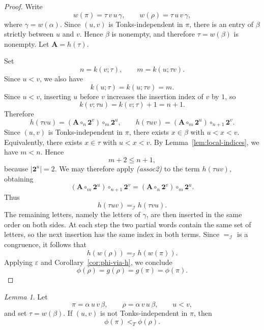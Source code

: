 \documentclass[a4paper]{article}
\theoremstyle{plain}
\theoremstyle{definition}
\theoremstyle{remark}
\numberwithin{equation}{section}
\renewcommand{\le}{\leqslant}\renewcommand{\ge}{\geqslant}
\newcommand{\eval}{\varepsilon}
\newtheorem{lemma}[theorem]{Lemma}
\begin{document}
\begin{proof}
Write
\[
w(\pi)=\tau\,v\,u\,\gamma,
\qquad
w(\rho)=\tau\,u\,v\,\gamma,
\]
where \(\gamma=w(\alpha)\). Since \((u,v)\) is Tonks-independent in \(\pi\),
there is an entry of \(\beta\) strictly between \(u\) and \(v\). Hence
\(\beta\) is nonempty, and therefore \(\tau=w(\beta)\) is nonempty. Let
\(\mathbf A=h(\tau)\).

Set
\[
n=k(v;\tau),
\qquad
m=k(u;\tau v).
\]
Since \(u<v\), we also have
\[
k(u;\tau)=k(u;\tau v)=m.
\]
Since \(u<v\), inserting \(u\) before \(v\) increases the insertion index of \(v\)
by \(1\), so
\[
k(v;\tau u)=k(v;\tau)+1=n+1.
\]
Therefore
\[
h(\tau v u)=(\mathbf A\circ_n \mathbf 2^v)\circ_m \mathbf 2^u,
\qquad
h(\tau u v)=(\mathbf A\circ_m \mathbf 2^u)\circ_{n+1}\mathbf 2^v.
\]
Since \((u,v)\) is Tonks-independent in \(\pi\), there exists \(x\in\beta\) with
\(u<x<v\). Equivalently, there exists \(x\in\tau\) with \(u<x<v\). By
Lemma~\ref{lem:local-indices}, we have \(m<n\). Hence
\[
m+2\le n+1,
\]
because \(|\mathbf 2^u|=2\). We may therefore apply \emph{(assoc2)} to the term
\(h(\tau u v)\), obtaining
\[
(\mathbf A\circ_m \mathbf 2^u)\circ_{n+1}\mathbf 2^v
=
(\mathbf A\circ_n \mathbf 2^v)\circ_m \mathbf 2^u.
\]
Thus
\[
h(\tau u v)=_{\mathcal I} h(\tau v u).
\]
The remaining letters, namely the letters of \(\gamma\), are then inserted in
the same order on both sides. At each step the two partial words contain the
same set of letters, so the next insertion has the same index in both terms.
Since \(=_{\mathcal I}\) is a congruence, it follows that
\[
h(w(\rho))=_{\mathcal I} h(w(\pi)).
\]
Applying \(\eval\) and Corollary~\ref{cor:phi-via-h}, we conclude
\[
\phi(\rho)=g(\rho)=g(\pi)=\phi(\pi).
\]
\end{proof}

\begin{lemma}\label{lem:dependent-rotation}
Let
\[
\pi=\alpha\,u\,v\,\beta,
\qquad
\rho=\alpha\,v\,u\,\beta,
\qquad
u<v,
\]
and set \(\tau=w(\beta)\). If \((u,v)\) is not Tonks-independent in \(\pi\), then
\[
\phi(\pi)<_T \phi(\rho).
\]
\end{lemma}
\end{document}
